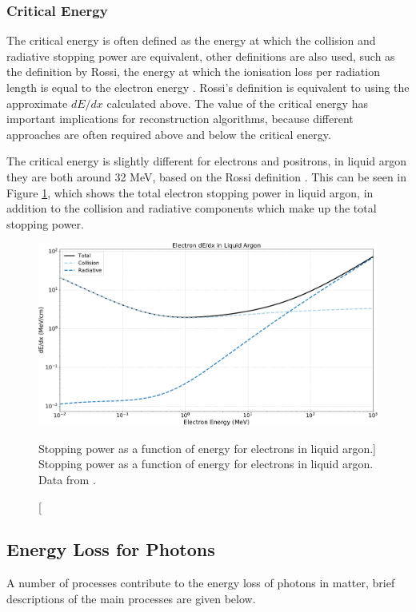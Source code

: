\subsubsection*{Critical Energy}
The critical energy is often defined as the energy at which the collision and 
radiative stopping power are equivalent, other definitions are also used, such
as the definition by Rossi, the energy at which the ionisation loss per
radiation length is equal to the electron energy \cite{TODO}. Rossi's 
definition is equivalent to using the approximate $dE/dx$ calculated 
above\cite{PhysRevD.98.030001}. The value of the critical energy has important 
implications for reconstruction algorithms, because different approaches are 
often required above and below the critical energy. 

The critical energy is slightly different for electrons and positrons, in 
liquid argon they are both around 32 MeV, based on the Rossi definition 
\cite{pdg_atomictables}. This can be seen in Figure \ref{fig:electron_dedx}, 
which shows the total electron stopping power in liquid argon, in addition to 
the collision and radiative components which make up the total stopping 
power. 

\begin{figure}

	\centering

	\includegraphics[width=\textwidth]{figures/electron_dedx_argon.pdf}

	\caption
	[Stopping power as a function of energy for electrons in liquid argon.]
	{Stopping power as a function of energy for electrons in liquid argon. Data
		from \cite{estar}.}

	\label{fig:electron_dedx}

\end{figure}

\subsection{Energy Loss for Photons}
A number of processes contribute to the energy loss of photons in matter, brief 
descriptions of the main processes are given below.

